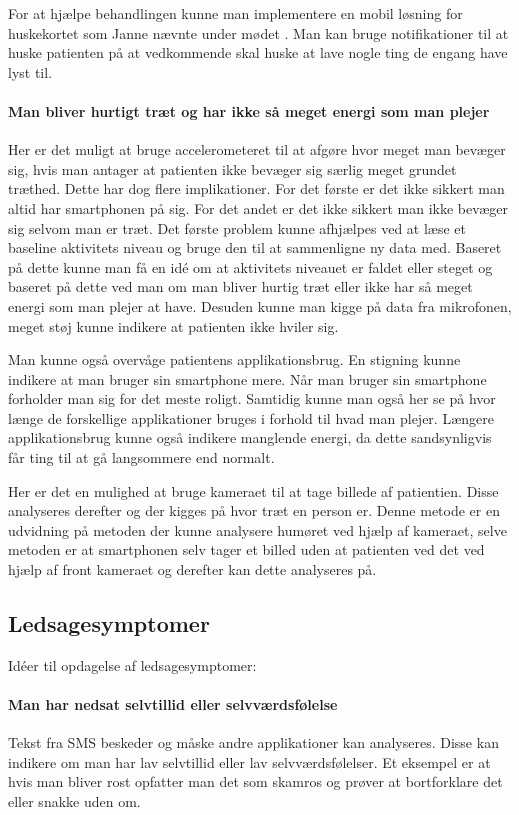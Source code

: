 For at hjælpe behandlingen kunne man implementere en mobil løsning for huskekortet som Janne nævnte under mødet \citep{misc:janne-rasmussen}. Man kan bruge notifikationer til at huske patienten på at vedkommende skal huske at lave nogle ting de engang have lyst til.

\paragraph{Man bliver hurtigt træt og har ikke så meget energi som man plejer}
Her er det muligt at bruge accelerometeret til at afgøre hvor meget man bevæger sig, hvis man antager at patienten ikke bevæger sig særlig meget grundet træthed. Dette har dog flere implikationer. For det første er det ikke sikkert man altid har smartphonen på sig. For det andet er det ikke sikkert man ikke bevæger sig selvom man er træt.
Det første problem kunne afhjælpes ved at læse et baseline aktivitets niveau og bruge den til at sammenligne ny data med. Baseret på dette kunne man få en idé om at aktivitets niveauet er faldet eller steget og baseret på dette ved man om man bliver hurtig træt eller ikke har så meget energi som man plejer at have. 
Desuden kunne man kigge på data fra mikrofonen, meget støj kunne indikere at patienten ikke hviler sig.

Man kunne også overvåge patientens applikationsbrug. 
En stigning kunne indikere at man bruger sin smartphone mere. 
Når man bruger sin smartphone forholder man sig for det meste roligt.
Samtidig kunne man også her se på hvor længe de forskellige applikationer bruges i forhold til hvad man plejer.
Længere applikationsbrug kunne også indikere manglende energi, da dette sandsynligvis får ting til at gå langsommere end normalt.

Her er det en mulighed at bruge kameraet til at tage billede af patientien. Disse analyseres derefter og der kigges på hvor træt en person er. 
Denne metode er en udvidning på metoden der kunne analysere humøret ved hjælp af kameraet, selve metoden er at smartphonen selv tager et billed uden at patienten ved det ved hjælp af front kameraet og derefter kan dette analyseres på.

\subsection{Ledsagesymptomer}\label{depr_ledsage}
Idéer til opdagelse af ledsagesymptomer:
\paragraph{Man har nedsat selvtillid eller selvværdsfølelse}
Tekst fra SMS beskeder og måske andre applikationer kan analyseres. Disse kan indikere om man har lav selvtillid eller lav selvværdsfølelser. Et eksempel er at hvis man bliver rost opfatter man det som skamros og prøver at bortforklare det eller snakke uden om.\cite{selvtillid}


